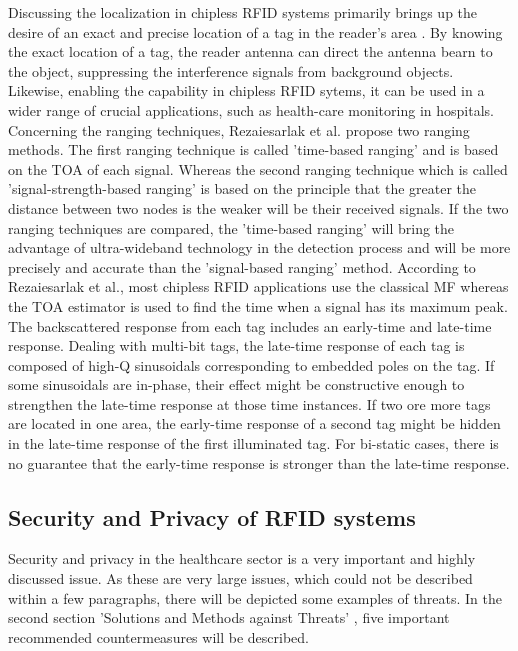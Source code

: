 Discussing the localization in chipless RFID systems primarily brings up the desire of an exact and precise location of a tag in the reader's area \cite[p.143 ff.]{chipless}. By knowing the exact location of a tag, the reader antenna can direct the antenna bearn to the object, suppressing the interference signals from background objects. Likewise, enabling the capability in chipless RFID sytems, it can be used in a wider range of crucial applications, such as health-care monitoring in hospitals.
Concerning the ranging techniques, Rezaiesarlak et al. \cite[p. 143 ff.]{chipless} propose two ranging methods. The first ranging technique is called 'time-based ranging' and is based on the \ac{TOA} of each signal. Whereas the second ranging technique which is called 'signal-strength-based ranging' is based on the principle that the greater the distance between two nodes is the weaker will be their received signals. If the two ranging techniques are compared, the 'time-based ranging' will bring the advantage of ultra-wideband technology in the detection process and will be more precisely and accurate than the 'signal-based ranging' method. 
According to Rezaiesarlak et al., most chipless RFID applications use the classical \ac{MF} whereas the TOA estimator is used to find the time when a signal has its maximum peak. The backscattered response from each tag includes an early-time and late-time response. Dealing with multi-bit tags, the late-time response of each tag is composed of high-Q sinusoidals corresponding to embedded poles on the tag. If some sinusoidals are in-phase, their effect might be constructive enough to strengthen the late-time response at those time instances. If two ore more tags are located in one area, the early-time response of a second tag might be hidden in the late-time response of the first illuminated tag. For bi-static cases, there is no guarantee that the early-time response is stronger than the late-time response. 
 
\subsection{Security and Privacy of RFID systems}

Security and privacy in the healthcare sector is a very important and highly discussed issue. As these are very large issues, which could not be described within a few paragraphs, there will be depicted some examples of threats. In the second section 'Solutions and Methods against Threats' \pageref{solution}, five important recommended countermeasures will be described.


